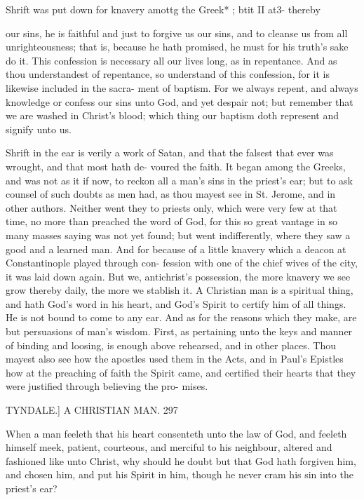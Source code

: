 \documentclass{custom}
\begin{document}
{Shrift was 
put down 
for knavery 
amottg the 
Greek* ; 
btit II at3- 
thereby 

our sins, he is faithful and just to forgive us our sins, and
to cleanse us from all unrighteousness; that is, because 
he hath promised, he must for his truth's sake do it. This 
confession is necessary all our lives long, as in repentance. 
And as thou understandest of repentance, so understand 
of this confession, for it is likewise included in the sacra- 
ment of baptism. For we always repent, and always 
knowledge or confess our sins unto God, and yet despair 
not; but remember that we are washed in Christ's blood;
which thing our baptism doth represent and signify 
unto us. 

Shrift in the ear is verily a work of Satan, and that the
falsest that ever was wrought, and that most hath de-
voured the faith. It began among the Greeks, and was
not as it if now, to reckon all a man's sins in the priest's
ear; but to ask counsel of such doubts as men had, as thou 
mayest see in St. Jerome, and in other authors. Neither 
went they to priests only, which were very few at that 
time, no more than preached the word of God, for this 
so great vantage in so many masses saying was not yet 
found; but went indifferently, where they saw a good and 
a learned man. And for because of a little knavery 
which a deacon at Constantinople played through con- 
fession with one of the chief wives of the city, it was laid 
down again. But we, antichrist's possession, the more 
knavery we see grow thereby daily, the more we stablish 
it. A Christian man is a spiritual thing, and hath God's 
word in his heart, and God's Spirit to certify him of all 
things. He is not bound to come to any ear. And as for 
the reasons which they make, are but persuasions of man's 
wisdom. First, as pertaining unto the keys and manner 
of binding and loosing, is enough above rehearsed, and in 
other places. Thou mayest also see how the apostles used 
them in the Acts, and in Paul's Epistles how at the
preaching of faith the Spirit came, and certified their
hearts that they were justified through believing the pro- 
mises. 


TYNDALE.]
A CHRISTIAN MAN.
297

When a man feeleth that his heart consenteth unto the 
law of God, and feeleth himself meek, patient, courteous, 
and merciful to his neighbour, altered and fashioned like 
unto Christ, why should he doubt but that God hath forgiven 
him, and chosen him, and put his Spirit in him, though 
he never cram his sin into the priest's ear? 

}
\end{document}

